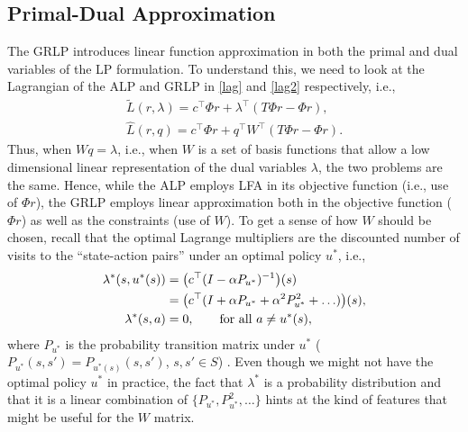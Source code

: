 \subsection{Primal-Dual Approximation}
The GRLP introduces linear function approximation in both the primal and dual variables of the LP formulation.
To understand this, we need to look at the Lagrangian of the ALP and GRLP in
\eqref{lag} and \eqref{lag2} respectively, i.e.,
\begin{align}\label{lag}
\tilde{L}(r,\lambda)=c^\top \Phi r+\lambda^\top (T\Phi r-\Phi r), \\ \label{lag2}\hat{L}(r,q)=c^\top \Phi r+q^\top W^\top (T\Phi r-\Phi r).
\end{align}
Thus, when $Wq = \lambda$, i.e., when $W$ is a set of basis functions that allow
a low dimensional linear representation of the dual variables $\lambda$,
the two problems are the same.
Hence, while the ALP employs LFA in its objective function (i.e., use of $\Phi r$), the GRLP employs linear approximation both in the objective function ($\Phi r$) as well as the constraints (use of $W$).
To get a sense of how $W$ should be chosen, recall that
the optimal Lagrange multipliers are the discounted number of visits to the ``state-action pairs'' under an optimal policy $u^*$, i.e.,
\begin{align}
\lambda^*(s,u^*(s))&=\big(c^\top(I-\alpha P_{u^*})^{-1}\big)(s)\nonumber\\
&= \big(c^\top(I+\alpha P_{u^*}+\alpha^2 P_{u^*}^2+\ldots)\big)(s),\nonumber\\
\lambda^*(s,a)&=0, \qquad \text{for all } a \neq u^*(s),\nonumber
\end{align}
where $P_{u^*}$ is the probability transition matrix under $u^*$ ($P_{u^*}(s,s') = P_{u^*(s)}(s,s')$, $s,s'\in S$) \cite{dolgov}. Even though we might not have the optimal policy $u^*$ in practice, the fact that $\lambda^*$ is a probability distribution and that it is a linear combination of $\{P_{u^*},P^2_{u^*},\ldots\}$ hints at the kind of features that might be useful for the $W$ matrix.

